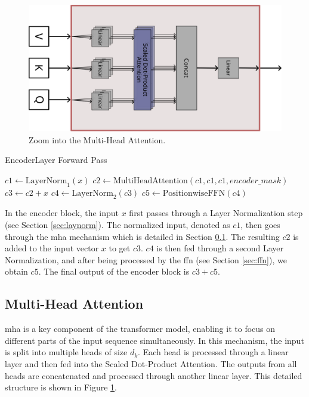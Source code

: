 
\begin{figure}[t]
    \centering
    \includegraphics[width=\textwidth]{contents/Basics/MHA.png}
    \caption{Zoom into the Multi-Head Attention.}
    \label{fig:multihead_attention}
\end{figure}

\begin{algorithm}[H]
\caption{EncoderLayer Forward Pass}
\label{alg:encoder_layer}
$c1 \gets \text{LayerNorm}_1(x)$\;
$c2 \gets \text{MultiHeadAttention}(c1, c1, c1, encoder\_mask)$\;
$c3 \gets c2 + x$\;
$c4 \gets \text{LayerNorm}_2(c3)$\;
$c5 \gets \text{PositionwiseFFN}(c4)$\;
\end{algorithm}


In the encoder block, the input $x$ first passes through a Layer Normalization step (see Section \ref{sec:laynorm}). The normalized input, denoted as $c1$, then goes through the \gls{mha} mechanism which is detailed in Section \ref{sec:mha}. The resulting $c2$ is added to the input vector $x$ to get $c3$. $c4$ is then fed through a second Layer Normalization, and after being processed by the \gls{ffn} (see Section \ref{sec:ffn}), we obtain $c5$. The final output of the encoder block is $c3 + c5$.


\subsection{Multi-Head Attention}
\label{sec:mha}
\gls{mha} is a key component of the transformer model, enabling it to focus on different parts of the input sequence simultaneously. In this mechanism, the input is split into multiple heads of size $d_k$. Each head is processed through a linear layer and then fed into the Scaled Dot-Product Attention. The outputs from all heads are concatenated and processed through another linear layer. This detailed structure is shown in Figure \ref{fig:multihead_attention}.

